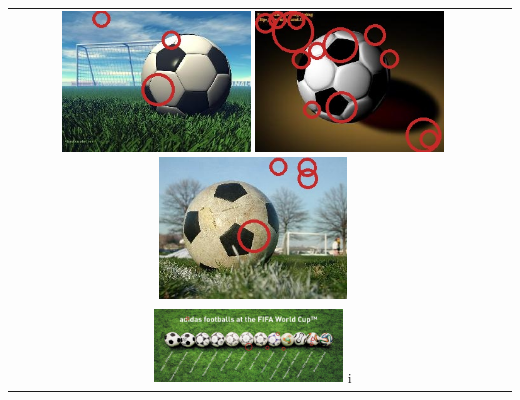 \begin{tabularx}{\textwidth}{llllll}
    \multicolumn{5}{c}{
        \includegraphics[width=5.0cm]{results/4/sphere_1}
        \includegraphics[width=5.0cm]{results/4/sphere_2}
        \includegraphics[width=5.0cm]{results/4/sphere_3}
    } \\
    \multicolumn{5}{c}{
        \includegraphics[width=5.0cm]{results/4/sphere_4}
    i}
\end{tabularx}
